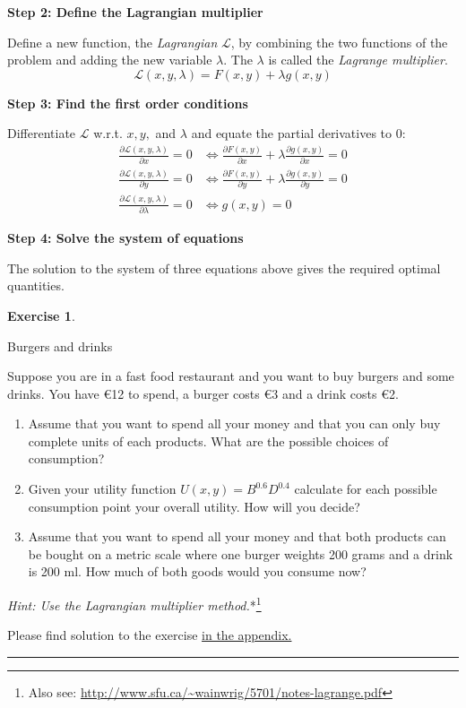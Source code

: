 \documentclass[
  12pt,
  oneside]{book}
\theoremstyle{definition}
\theoremstyle{definition}
\theoremstyle{definition}
\newtheorem{exercise}{Exercise}[chapter]
\theoremstyle{definition}
\theoremstyle{remark}
\begin{document}
\textbf{Step 2: Define the Lagrangian multiplier}

Define a new function, the \emph{Lagrangian} \(\mathcal{L}\), by combining the two functions of the problem and adding the new variable \(\lambda\). The \(\lambda\) is called the \emph{Lagrange multiplier}.
\[\mathcal{L}(x, y, \lambda)=F(x, y)+\lambda g(x, y)\]

\textbf{Step 3: Find the first order conditions}

Differentiate \(\mathcal{L}\) w.r.t. \(x, y,\) and \(\lambda\) and equate the partial derivatives to 0: \[\begin{aligned}
\frac{\partial \mathcal{L}(x, y, \lambda)}{\partial x}=0 & \Leftrightarrow \frac{\partial F(x, y)}{\partial x}+\lambda \frac{\partial g(x, y)}{\partial x}=0 \\
\frac{\partial \mathcal{L}(x, y, \lambda)}{\partial y}=0 & \Leftrightarrow \frac{\partial F(x, y)}{\partial y}+\lambda \frac{\partial g(x, y)}{\partial y}=0 \\
\frac{\partial \mathcal{L}(x, y, \lambda)}{\partial \lambda}=0 & \Leftrightarrow g(x, y)=0\end{aligned}\]

\textbf{Step 4: Solve the system of equations}

The solution to the system of three equations above gives the required optimal quantities.

\begin{exercise}
\protect\hypertarget{exr:burger}{}\label{exr:burger}

Burgers and drinks

Suppose you are in a fast food restaurant and you want to buy burgers and some drinks. You have €12 to spend, a burger costs €3 and a drink costs €2.

\begin{enumerate}
\def\labelenumi{\alph{enumi})}
\item
  Assume that you want to spend all your money and that you can only buy complete units of each products. What are the possible choices of consumption?
\item
  Given your utility function \(U(x,y)=B^{0.6}D^{0.4}\) calculate for each possible consumption point your overall utility. How will you decide?
\item
  Assume that you want to spend all your money and that both products can be bought on a metric scale where one burger weights 200 grams and a drink is 200 ml. How much of both goods would you consume now?
\end{enumerate}

\emph{Hint: Use the Lagrangian multiplier method.}*\footnote{Also see: \url{http://www.sfu.ca/~wainwrig/5701/notes-lagrange.pdf}}

Please find solution to the exercise \protect\hyperlink{sol:burger}{in the appendix.}

\begin{center}\rule{0.5\linewidth}{0.5pt}\end{center}

\end{exercise}
\end{document}

